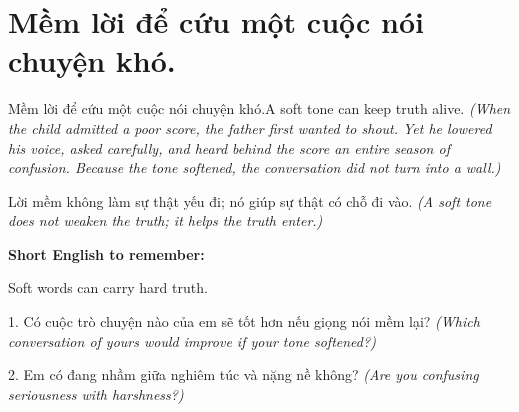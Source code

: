 \section{Mềm lời để cứu một cuộc nói chuyện khó.}
\begin{truyen}{Mềm lời để cứu một cuộc nói chuyện khó.}{A soft tone can keep truth alive.}
\textit{(When the child admitted a poor score, the father first wanted to shout. Yet he lowered his voice, asked carefully, and heard behind the score an entire season of confusion. Because the tone softened, the conversation did not turn into a wall.)}
\end{truyen}
\begin{baihoc}
Lời mềm không làm sự thật yếu đi; nó giúp sự thật có chỗ đi vào.
\textit{(A soft tone does not weaken the truth; it helps the truth enter.)}
\end{baihoc}
\begin{ghinhoanh}
\textbf{Short English to remember:}

Soft words can carry hard truth.
\end{ghinhoanh}
\begin{tuhocnhanh}
1. Có cuộc trò chuyện nào của em sẽ tốt hơn nếu giọng nói mềm lại? \textit{(Which conversation of yours would improve if your tone softened?)}

2. Em có đang nhầm giữa nghiêm túc và nặng nề không? \textit{(Are you confusing seriousness with harshness?)}
\end{tuhocnhanh}
\ngancach

